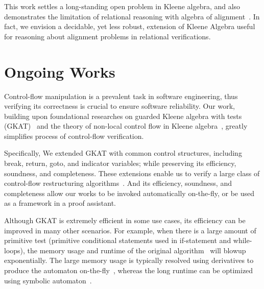 \documentclass[11pt,a4paper,sans]{moderncv} %
\begin{document}
This work settles a long-standing open problem in Kleene algebra, and also demonstrates the limitation of relational reasoning with algebra of alignment~\cite{antonopoulos_AlgebraAlignmentRelational_2023}. In fact, we envision a decidable, yet less robust, extension of Kleene Algebra useful for reasoning about alignment problems in relational verifications.

\section{Ongoing Works}


Control-flow manipulation is a prevalent task in software engineering, thus verifying its correctness is crucial to ensure software reliability.
Our work, building upon foundational researches on guarded Kleene algebra with tests (GKAT)~\cite{smolka_GuardedKleeneAlgebra_2020} and the theory of non-local control flow in Kleene algebra~\cite{kozen_NonlocalFlowControl_2008a}, greatly simplifies process of control-flow verification.

Specifically, We extended GKAT with common control structures, including break, return, goto, and indicator variables; while preserving its efficiency, soundness, and completeness.
These extensions enable us to verify a large class of control-flow restructuring algorithms~\cite{yakdan_NoMoreGotos_2015,basque_AhoySAILRThere_,erosa_TamingControlFlow_1994,kozen_CertificationCompilerOptimizations_2000a}.
And its efficiency, soundness, and completeness allow our works to be invoked automatically on-the-fly, or be used as a framework in a proof assistant.



Although GKAT is extremely efficient in some use cases, its efficiency can be improved in many other scenarios. 
For example, when there is a large amount of primitive test (primitive conditional statements used in if-statement and while-loops), the memory usage and runtime of the original algorithm~\cite{smolka_GuardedKleeneAlgebra_2020} will blowup exponentially. 
The large memory usage is typically resolved using derivatives to produce the automaton on-the-fly~\cite{brzozowski_DerivativesRegularExpressions_1964, schmid_GuardedKleeneAlgebra_2021}, whereas the long runtime can be optimized using symbolic automaton~\cite{pous_SymbolicAlgorithmsLanguage_2015}. 
\end{document}
